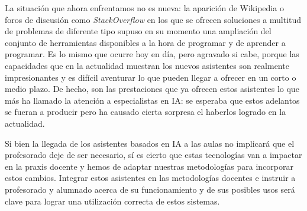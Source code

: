 \documentclass[twocolumn,twoside,a4paper, 10pt]{article}
\begin{document}
La situación que ahora enfrentamos no es nueva: la aparición de Wikipedia 
o foros de discusión como
\textit{StackOverflow} en los que se ofrecen soluciones a multitud de problemas de diferente tipo supuso en su
momento una ampliación del conjunto de herramientas disponibles a la hora de programar y de aprender a
programar.
Es lo mismo que ocurre hoy en día, pero agravado si cabe, porque las capacidades que en la
actualidad muestran los nuevos asistentes son realmente impresionantes y es difícil aventurar lo que pueden
llegar a ofrecer en un corto o medio plazo.
De hecho, son las prestaciones que ya ofrecen estos asistentes lo que más ha llamado la atención a
especialistas en IA: se esperaba que estos adelantos se fueran a producir pero ha causado cierta sorpresa el
haberlos logrado en la actualidad.

Si bien la llegada de los asistentes basados en IA a las aulas no implicará que el profesorado deje de ser
necesario, sí es cierto que estas tecnologías van a impactar en la praxis docente y hemos de adaptar nuestras
metodologías para incorporar estos cambios.
Integrar estos asistentes en las metodologías docentes e instruir a profesorado y alumnado acerca de su 
funcionamiento y de sus posibles usos será clave para lograr una utilización correcta de estos sistemas.
\balance{}


\end{document}
